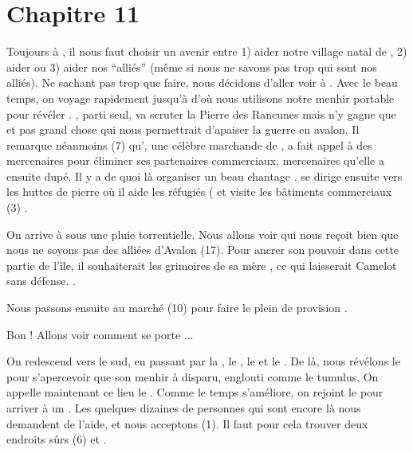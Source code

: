 \documentclass[11pt]{article}
\begin{document}
{%
\section{Chapitre 11}

Toujours à \longcairn{}, il nous faut choisir un avenir entre 1) aider notre village natal de \cuanacht{}, 2) aider \newcamelot{} ou 3) aider nos ``alliés'' (même si nous ne savons pas trop qui sont nos alliés). Ne sachant pas trop que faire, nous décidons d'aller voir \mordred{} à \nidcorbeaux{}. Avec le beau temps, on voyage rapidement jusqu'à \croisee{} d'où nous utilisons notre menhir portable pour révéler \nidcorbeaux{}. \beor{}, parti seul, va scruter la Pierre des Rancunes mais n'y gagne que \gain{\terror[1]} et pas grand chose qui nous permettrait d'apaiser la guerre en avalon. Il remarque néanmoins (7) qu'\aelisa{}, une célèbre marchande de \boismuraille{}, a fait appel à des mercenaires pour éliminer ses partenaires commerciaux, mercenaires qu'elle a ensuite dupé. Il y a de quoi là organiser un beau chantage . \beor{} se dirige ensuite vers les huttes de pierre où il aide les réfugiés ( et visite les bâtiments commerciaux (3) .

On arrive à \nidcorbeaux{} sous une pluie torrentielle. Nous allons voir \mordred{} qui nous reçoit bien que nous ne soyons pas des alliées d'Avalon (17). Pour ancrer son pouvoir dans cette partie de l'île, il souhaiterait les grimoires de sa mère \morgane{}, ce qui laisserait Camelot sans défense. .


Nous passons ensuite au marché (10) pour faire le plein de provision .

Bon ! Allons voir comment se porte \cuanacht{}...

On redescend vers le sud, en passant par la \croisee{}, le \cerclelunaire{}, le \visageserein{} et le \valsanglant{}. De là, nous révélons le \tumulus{} pour s'apercevoir que son menhir à disparu, englouti comme le tumulus. On appelle maintenant ce lieu le \tumulusengloutis{} . Comme le temps s'améliore, on rejoint le \bosquet{} pour arriver à un \cuanachtdevaste{}. Les quelques dizaines de personnes qui sont encore là nous demandent de l'aide, et nous acceptons (1). Il faut pour cela trouver deux endroits sûrs (6) et  .

}
\end{document}
